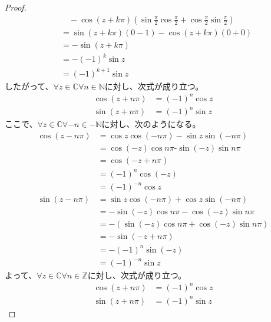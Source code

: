\documentclass[dvipdfmx]{jsarticle}
\begin{document}
\begin{proof}
\begin{align*}
&\quad - \cos(z + k\pi)\left( \sin\frac{\pi}{2}\cos\frac{\pi}{2} + \cos\frac{\pi}{2}\sin\frac{\pi}{2} \right)\\
&= \sin(z + k\pi)(0 - 1) - \cos(z + k\pi)(0 + 0)\\
&= - \sin(z + k\pi)\\
&= - ( - 1)^{k}\sin z\\
&= ( - 1)^{k + 1}\sin z
\end{align*}
したがって、$\forall z \in \mathbb{C}\forall n \in \mathbb{N}$に対し、次式が成り立つ。
\begin{align*}
\cos(z + n\pi) &= ( - 1)^{n}\cos z\\
\sin(z + n\pi) &= ( - 1)^{n}\sin z
\end{align*}
ここで、$\forall z \in \mathbb{C}\forall - n \in - \mathbb{N}$に対し、次のようになる。
\begin{align*}
\cos(z - n\pi) &= \cos z\cos( - n\pi) - \sin z\sin( - n\pi)\\
&= \cos( - z)\cos{n\pi}\text{-}\sin( - z)\sin{n\pi}\\
&= \cos( - z + n\pi)\\
&= ( - 1)^{n}\cos( - z)\\
&= ( - 1)^{- n}\cos z\\
\sin(z - n\pi) &= \sin z\cos( - n\pi) + \cos z\sin( - n\pi)\\
&= - \sin( - z)\cos{n\pi} - \cos( - z)\sin{n\pi}\\
&= - \left( \sin( - z)\cos{n\pi} + \cos( - z)\sin{n\pi} \right)\\
&= - \sin( - z + n\pi)\\
&= - ( - 1)^{n}\sin( - z)\\
&= ( - 1)^{- n}\sin z
\end{align*}
よって、$\forall z \in \mathbb{C}\forall n \in \mathbb{Z}$に対し、次式が成り立つ。
\begin{align*}
\cos(z + n\pi) &= ( - 1)^{n}\cos z\\
\sin(z + n\pi) &= ( - 1)^{n}\sin z
\end{align*}
\end{proof}
\end{document}
